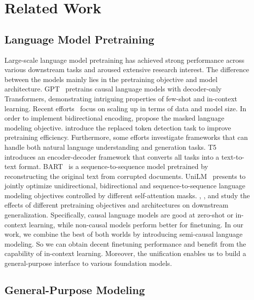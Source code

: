 \documentclass{article}
\theoremstyle{plain}
\theoremstyle{definition}
\theoremstyle{remark}
\begin{document}
\section{Related Work}
\label{sec:related}

\subsection{Language Model Pretraining}

Large-scale language model pretraining has achieved strong performance across various downstream tasks and aroused extensive research interest.
The difference between the models mainly lies in the pretraining objective and model architecture.
GPT~\citep{gpt1,gpt2,gpt3} pretrains causal language models with decoder-only Transformers, demonstrating intriguing properties of few-shot and in-context learning.
Recent efforts~\citep{gopher,glam,mt-nlg,chinchilla,lamda,palm} focus on scaling up in terms of data and model size.
In order to implement bidirectional encoding, \citet{bert} propose the masked language modeling objective.
\citet{electra} introduce the replaced token detection task to improve pretraining efficiency.
Furthermore, some efforts investigate frameworks that can handle both natural language understanding and generation tasks.
T5~\citep{t5} introduces an encoder-decoder framework that converts all tasks into a text-to-text format.
BART~\citep{bart} is a sequence-to-sequence model pretrained by reconstructing the original text from corrupted documents.
UniLM~\citep{unilm,unilmv2} presents to jointly optimize unidirectional, bidirectional and sequence-to-sequence language modeling objectives controlled by different self-attention masks.
\citet{what:lm:objective}, \citet{unifypara}, and \citet{role:bidirectionality} study the effects of different pretraining objectives and architectures on downstream generalization.
Specifically, causal language models are good at zero-shot or in-context learning, while non-causal models perform better for finetuning.
In our work, we combine the best of both worlds by introducing semi-causal language modeling. So we can obtain decent finetuning performance and benefit from the capability of in-context learning.
Moreover, the unification enables us to build a general-purpose interface to various foundation models.


\subsection{General-Purpose Modeling}
\end{document}

